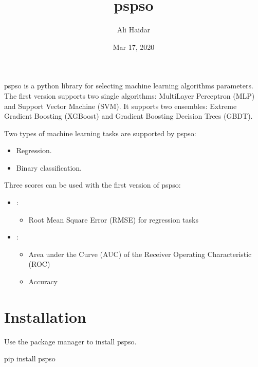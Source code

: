 \documentclass[letterpaper,10pt,english]{sphinxmanual}
\title{pspso}
\date{Mar 17, 2020}
\author{Ali Haidar}
\begin{document}
\pagestyle{empty}
\sphinxmaketitle
\pagestyle{plain}
\sphinxtableofcontents
\pagestyle{normal}
\label{\detokenize{index::doc}}


pspso is a python library for selecting machine learning algorithms
parameters. The first version supports two single algorithms:
Multi\sphinxhyphen{}Layer Perceptron (MLP) and Support Vector Machine (SVM). It
supports two ensembles: Extreme Gradient Boosting (XGBoost) and Gradient
Boosting Decision Trees (GBDT).

Two types of machine learning tasks are supported by pspso:
\begin{itemize}
\item {} 
Regression.

\item {} 
Binary classification.

\end{itemize}

Three scores can be used with the first version of pspso:
\begin{itemize}
\item {} 
 :
\begin{itemize}
\item {} 
Root Mean Square Error (RMSE) for regression tasks

\end{itemize}

\item {} 
 :
\begin{itemize}
\item {} 
Area under the Curve (AUC) of the Receiver Operating Characteristic (ROC)

\item {} 
Accuracy

\end{itemize}

\end{itemize}


\chapter{Installation}
\label{\detokenize{index:installation}}
Use the package manager  to
install pspso.

\begin{sphinxVerbatim}[commandchars=\\\{\}]
pip install pspso
\end{sphinxVerbatim}
\end{document}
